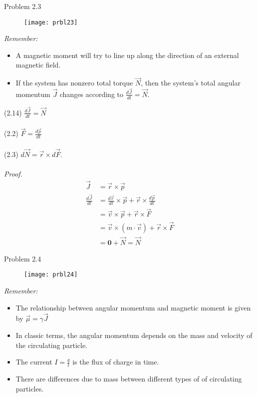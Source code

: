 \clearpage
\Large{Problem 2.3}

\begin{figure}[H]
        \centering
        \texttt{[image: prbl23]}
        \label{fig:prbl23}
\end{figure}

\textit{Remember:}
\begin{itemize}
	\item A magnetic moment will try to line up along the direction of 
	an external magnetic field.
	\item If the system has nonzero total torque $\vec{N}$, then the 
	system's total angular momentum $\vec{J}$ changes according to 
	$\frac{d\vec{J}}{dt} = \vec{N}$.
\end{itemize}

(2.14) $\frac{d\vec{J}}{dt} = \vec{N}$ \\ \\
(2.2) $\vec{F} = \frac{d\vec{p}}{dt}$ \\ \\
(2.3) $d\vec{N} = \vec{r} \times d\vec{F}$.\\  \\
\textit{Proof.}
\begin{align*}
    \vec{J} & = \vec{r} \times \vec{p} \\
    \frac{d\vec{J}}{dt} & = \frac{d\vec{r}}{dt} \times \vec{p} + \vec{r} \times \frac{d\vec{p}}{dt} \\
    & = \vec{v} \times \vec{p} + \vec{r} \times \vec{F} \\
    & = \vec{v} \times (m \cdot \vec{v} ) + \vec{r} \times \vec{F} \\
    & = \mathbf{0} + \vec{N} = \vec{N}
\end{align*} 

\clearpage
\Large{Problem 2.4}

\begin{figure}[H]
        \centering
        \texttt{[image: prbl24]}
        \label{fig:prbl24}
\end{figure}

\textit{Remember:}
\begin{itemize}
	\item The relationship between angular momentum and magnetic 
	moment is given by $\vec{\mu} = \gamma \vec{J}$
	\item In classic terms, the angular momentum depends on the mass 
	and velocity of the circulating particle.
	\item The current $I = \frac{q}{t}$ is the flux of charge in time.
	\item There are differences due to mass between different types of 
	of circulating particles.
\end{itemize}

